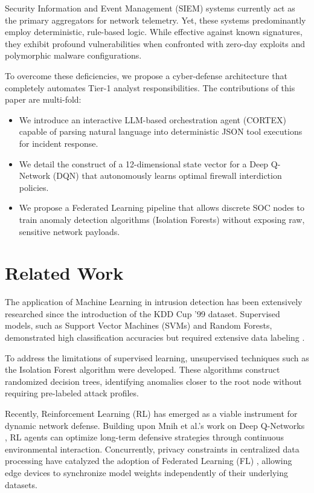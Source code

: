 \documentclass[conference]{IEEEtran}
\begin{document}
Security Information and Event Management (SIEM) systems currently act as the primary aggregators for network telemetry. Yet, these systems predominantly employ deterministic, rule-based logic. While effective against known signatures, they exhibit profound vulnerabilities when confronted with zero-day exploits and polymorphic malware configurations. 

To overcome these deficiencies, we propose a cyber-defense architecture that completely automates Tier-1 analyst responsibilities. The contributions of this paper are multi-fold:
\begin{itemize}
    \item We introduce an interactive LLM-based orchestration agent (CORTEX) capable of parsing natural language into deterministic JSON tool executions for incident response.
    \item We detail the construct of a 12-dimensional state vector for a Deep Q-Network (DQN) that autonomously learns optimal firewall interdiction policies.
    \item We propose a Federated Learning pipeline that allows discrete SOC nodes to train anomaly detection algorithms (Isolation Forests) without exposing raw, sensitive network payloads.
\end{itemize}

\section{Related Work}
The application of Machine Learning in intrusion detection has been extensively researched since the introduction of the KDD Cup '99 dataset. Supervised models, such as Support Vector Machines (SVMs) and Random Forests, demonstrated high classification accuracies but required extensive data labeling \cite{kdd_analysis}.

To address the limitations of supervised learning, unsupervised techniques such as the Isolation Forest algorithm \cite{isolation_forest} were developed. These algorithms construct randomized decision trees, identifying anomalies closer to the root node without requiring pre-labeled attack profiles.

Recently, Reinforcement Learning (RL) has emerged as a viable instrument for dynamic network defense. Building upon Mnih et al.'s work on Deep Q-Networks \cite{mnih2015human}, RL agents can optimize long-term defensive strategies through continuous environmental interaction. Concurrently, privacy constraints in centralized data processing have catalyzed the adoption of Federated Learning (FL) \cite{mcmahan2017communication}, allowing edge devices to synchronize model weights independently of their underlying datasets.
\end{document}
